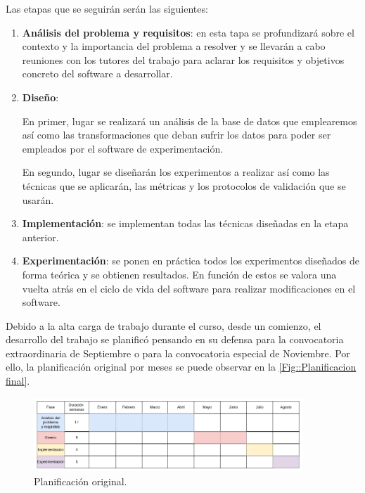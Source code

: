     \medskip

    \noindent Las etapas que se seguirán serán las siguientes:

    \begin{enumerate}
        \item \textbf{Análisis del problema y requisitos}: en esta tapa se profundizará sobre el contexto y la importancia del problema a resolver y se llevarán a cabo reuniones con los tutores del trabajo para aclarar los requisitos y objetivos concreto del software a desarrollar. 
        \item \textbf{Diseño}:
        
        En primer, lugar se realizará un análisis de la base de datos que emplearemos así como las transformaciones que deban sufrir los datos para poder ser empleados por el software de experimentación. 

        En segundo, lugar se diseñarán los experimentos a realizar así como las técnicas que se aplicarán, las métricas y los protocolos de validación que se usarán.

        \item \textbf{Implementación}: se implementan todas las técnicas diseñadas en la etapa anterior.
        \item \textbf{Experimentación}: se ponen en práctica todos los experimentos diseñados de forma teórica y se obtienen resultados. En función de estos se valora una vuelta atrás en el ciclo de vida del software para realizar modificaciones en el software.
    \end{enumerate}
    
    \medskip

    \noindent Debido a la alta carga de trabajo durante el curso, desde un comienzo, el desarrollo del trabajo se planificó pensando en su defensa para la convocatoria extraordinaria de Septiembre o para la convocatoria especial de Noviembre. Por ello, la planificación original por meses se puede observar en la \autoref{Fig::Planificacion final}.


    \begin{figure}[!h]
        \centering
        \includegraphics[width=0.9\textwidth]{img/plan_provisional.png}
        \caption{Planificación original.}
        \label{Fig::Planificacion original}
    \end{figure}

